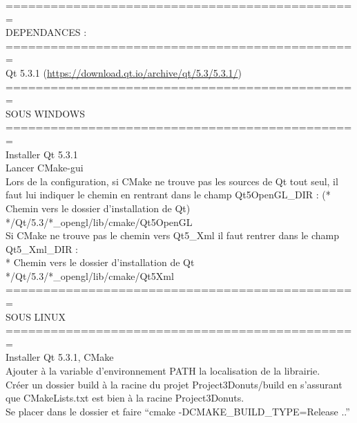 \noindent ===============================================\\
\noindent DEPENDANCES :\\
\noindent ===============================================\\
\noindent Qt 5.3.1 (\url{https://download.qt.io/archive/qt/5.3/5.3.1/})\\

\noindent ===============================================\\
\noindent SOUS WINDOWS\\
\noindent ===============================================\\
\noindent Installer Qt 5.3.1\\

\noindent Lancer CMake-gui\\

\noindent Lors de la configuration, si CMake ne trouve pas les sources de Qt tout seul, il faut lui indiquer le chemin en rentrant dans le champ Qt5OpenGL\_DIR : (* Chemin vers le dossier d'installation de Qt)\\

*/Qt/5.3/*\_opengl/lib/cmake/Qt5OpenGL\\

\noindent Si CMake ne trouve pas le chemin vers Qt5\_Xml il faut rentrer dans le champ Qt5\_Xml\_DIR :\\

* Chemin vers le dossier d'installation de Qt */Qt/5.3/*\_opengl/lib/cmake/Qt5Xml\\

\noindent ===============================================\\
\noindent SOUS LINUX\\
\noindent ===============================================\\
\noindent Installer Qt 5.3.1, CMake \\

\noindent Ajouter à la variable d'environnement PATH la localisation de la librairie. \\

\noindent Créer un dossier build à la racine du projet Project3Donuts/build en s'assurant que CMakeLists.txt est bien à la racine Project3Donuts.\\

\noindent Se placer dans le dossier et faire ``cmake -DCMAKE\_BUILD\_TYPE=Release ..''\\

